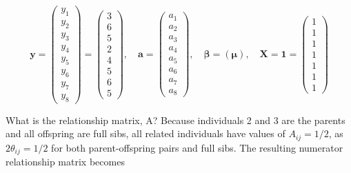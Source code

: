 \documentclass{article}
\begin{document}
\begin{equation}
\mathbf{y}=\begin{pmatrix}y_{1}\\ y_{2}\\ y_{3}\\ y_{4}\\ y_{5}\\ y_{6}\\ y_{7}\\ y_{8}\end{pmatrix}=\begin{pmatrix}3\\ 6\\ 5\\ 2\\ 4\\ 5\\ 6\\ 5\end{pmatrix},\quad\mathbf{a}=\begin{pmatrix}a_{1}\\ a_{2}\\ a_{3}\\ a_{4}\\ a_{5}\\ a_{6}\\ a_{7}\\ a_{8}\end{pmatrix},\quad\boldsymbol{\beta}=(\boldsymbol{\mu}),\quad\mathbf{X}=\mathbf{1}=\begin{pmatrix}1\\ 1\\ 1\\ 1\\ 1\\ 1\\ 1\end{pmatrix}
\end{equation}

What is the relationship matrix, A? Because individuals 2 and 3 are the parents and all offspring are full sibs, all related individuals have values of  $ A_{ij} = 1/2 $, as  $ 2\theta_{ij} = 1/2 $ for both parent-offspring pairs and full sibs. The resulting numerator relationship matrix becomes
\end{document}
